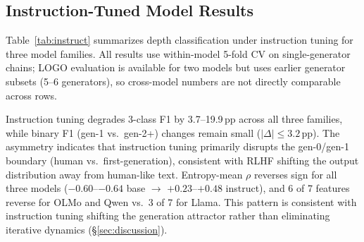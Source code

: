 \subsection*{Instruction-Tuned Model Results}

Table~\ref{tab:instruct} summarizes depth classification under instruction tuning for three model families.
All results use within-model 5-fold CV on single-generator chains; LOGO evaluation is available for two models but uses earlier generator subsets (5--6 generators), so cross-model numbers are not directly comparable across rows.

\begin{table}[ht]
\centering
\small
\caption{Depth classification: base vs.\ instruction-tuned models (within-model 5-fold CV). $\rho$: Spearman correlation of entropy mean with depth. Rev.: number of features (out of 7) whose $\rho$ reverses sign under instruction tuning.}
\label{tab:instruct}
\end{table}

Instruction tuning degrades 3-class F1 by 3.7--19.9\,pp across all three families, while binary F1 (gen-1 vs.\ gen-2+) changes remain small ($|\Delta| \leq 3.2$\,pp).
The asymmetry indicates that instruction tuning primarily disrupts the gen-0/gen-1 boundary (human vs.\ first-generation), consistent with RLHF shifting the output distribution away from human-like text.
Entropy-mean $\rho$ reverses sign for all three models ($-0.60$--$-0.64$ base $\rightarrow$ $+0.23$--$+0.48$ instruct), and 6 of 7 features reverse for OLMo and Qwen vs.\ 3 of 7 for Llama.
This pattern is consistent with instruction tuning shifting the generation attractor rather than eliminating iterative dynamics (\S\ref{sec:discussion}).

